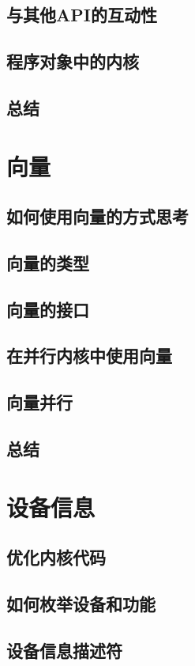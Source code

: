 \documentclass[11pt,a4paper,UTF8]{ctexart}
\begin{document}
		\subsection{与其他API的互动性}
		\subsection{程序对象中的内核}
		\subsection{总结}
	\section{向量}
		\subsection{如何使用向量的方式思考}
		\subsection{向量的类型}
		\subsection{向量的接口}
		\subsection{在并行内核中使用向量}
		\subsection{向量并行}
		\subsection{总结}
	\section{设备信息}
		\subsection{优化内核代码}
		\subsection{如何枚举设备和功能}
		\subsection{设备信息描述符}
\end{document}
